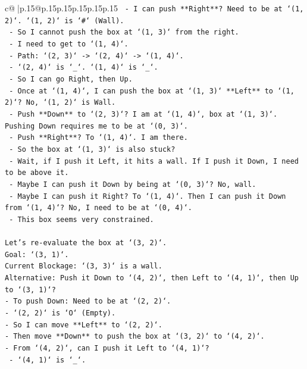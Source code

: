 \documentclass{article}
\begin{document}
{\begin{supertabular}{c@{$\;$}|p{.15\linewidth}@{}p{.15\linewidth}p{.15\linewidth}p{.15\linewidth}p{.15\linewidth}p{.15\linewidth}}
{{{\texttt{    {-} I can push **Right**? Need to be at `(1, 2)`. `(1, 2)` is `\#` (Wall).} \\
\texttt{    {-} So I cannot push the box at `(1, 3)` from the right.} \\
\texttt{    {-} I need to get to `(1, 4)`.} \\
\texttt{    {-} Path: `(2, 3)` {-}> `(2, 4)` {-}> `(1, 4)`.} \\
\texttt{    {-} `(2, 4)` is `\_`. `(1, 4)` is `\_`.} \\
\texttt{    {-} So I can go Right, then Up.} \\
\texttt{    {-} Once at `(1, 4)`, I can push the box at `(1, 3)` **Left** to `(1, 2)`? No, `(1, 2)` is Wall.} \\
\texttt{    {-} Push **Down** to `(2, 3)`? I am at `(1, 4)`, box at `(1, 3)`. Pushing Down requires me to be at `(0, 3)`.} \\
\texttt{    {-} Push **Right**? To `(1, 4)`. I am there.} \\
\texttt{    {-} So the box at `(1, 3)` is also stuck?} \\
\texttt{    {-} Wait, if I push it Left, it hits a wall. If I push it Down, I need to be above it.} \\
\texttt{    {-} Maybe I can push it Down by being at `(0, 3)`? No, wall.} \\
\texttt{    {-} Maybe I can push it Right? To `(1, 4)`. Then I can push it Down from `(1, 4)`? No, I need to be at `(0, 4)`.} \\
\texttt{    {-} This box seems very constrained.} \\
\\ 
\texttt{Let's re{-}evaluate the box at `(3, 2)`.} \\
\texttt{Goal: `(3, 1)`.} \\
\texttt{Current Blockage: `(3, 3)` is a wall.} \\
\texttt{Alternative: Push it Down to `(4, 2)`, then Left to `(4, 1)`, then Up to `(3, 1)`?} \\
\texttt{{-} To push Down: Need to be at `(2, 2)`.} \\
\texttt{{-} `(2, 2)` is `O` (Empty).} \\
\texttt{{-} So I can move **Left** to `(2, 2)`.} \\
\texttt{{-} Then move **Down** to push the box at `(3, 2)` to `(4, 2)`.} \\
\texttt{{-} From `(4, 2)`, can I push it Left to `(4, 1)`?} \\
\texttt{  {-} `(4, 1)` is `\_`.} \\
}}}
\end{supertabular}}
\end{document}
